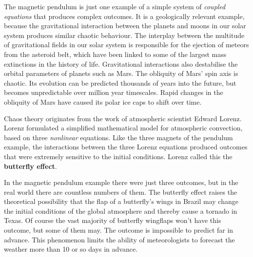 The magnetic pendulum is just one example of a simple system of
\emph{coupled equations} that produces complex outcomes. It is a
geologically relevant example, because the gravitational interaction
between the planets and moons in our solar system produces similar
chaotic behaviour.  The interplay between the multitude of
gravitational fields in our solar system is responsible for the
ejection of meteors from the asteroid belt, which have been linked to
some of the largest mass extinctions in the history of
life. Gravitational interactions also destabilise the orbital
parameters of planets such as Mars. The obliquity of Mars' spin axis
is chaotic. Its evolution can be predicted thousands of years into the
future, but becomes unpredictable over million year timescales. Rapid
changes in the obliquity of Mars have caused its polar ice caps to
shift over time.\medskip

Chaos theory originates from the work of atmospheric scientist Edward
Lorenz. Lorenz formulated a simplified mathematical model for
atmospheric convection, based on three \emph{nonlinear} equations.
Like the three magnets of the pendulum example, the interactions
between the three Lorenz equations produced outcomes that were
extremely sensitive to the initial conditions. Lorenz called this the
\textbf{butterfly effect}.\medskip

In the magnetic pendulum example there were just three outcomes, but
in the real world there are countless numbers of them. The butterfly
effect raises the theoretical possibility that the flap of a
butterfly's wings in Brazil may change the initial conditions of the
global atmosphere and thereby cause a tornado in Texas. Of course the
vast majority of butterfly wingflaps won't have this outcome, but some
of them may. The outcome is impossible to predict far in advance.
This phenomenon limits the ability of meteorologists to forecast the
weather more than 10 or so days in advance.
